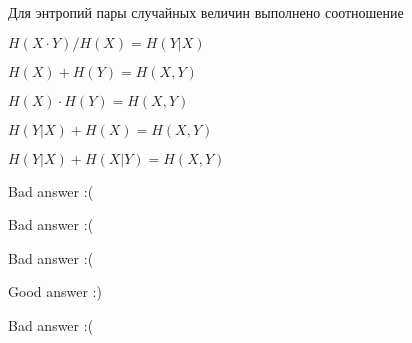 
\begin{question}
Для энтропий пары случайных величин выполнено соотношение
\begin{answerlist}
  \item \(H(X\cdot Y) / H(X) = H(Y|X)\)
  \item \(H(X) + H(Y) = H(X, Y)\)
  \item \(H(X) \cdot H(Y) = H(X, Y)\)
  \item \(H(Y|X) + H(X) = H(X, Y)\)
  \item \(H(Y|X) + H(X|Y) = H(X, Y)\)
\end{answerlist}
\end{question}

\begin{solution}
\begin{answerlist}
  \item Bad answer :(
  \item Bad answer :(
  \item Bad answer :(
  \item Good answer :)
  \item Bad answer :(
\end{answerlist}
\end{solution}

